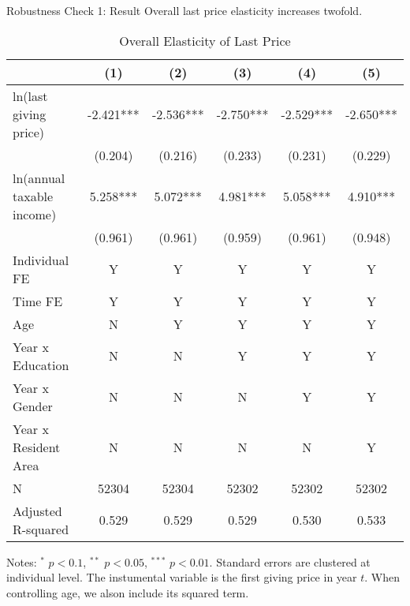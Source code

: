\documentclass[
  ignorenonframetext,
  aspectratio=169,
]{beamer}
\begin{document}
\begin{frame}{Robustness Check 1: Result}
\protect\hypertarget{robustness-check-1-result}{}
Overall last price elasticity increases twofold.

\begin{table}

\caption{\label{tab:LastOverall}Overall Elasticity of Last Price}
\centering
\fontsize{7}{9}\selectfont
\begin{threeparttable}
\begin{tabular}[t]{lccccc}
\toprule
 & (1) & (2) & (3) & (4) & (5)\\
\midrule
ln(last giving price) & -2.421*** & -2.536*** & -2.750*** & -2.529*** & -2.650***\\
 & (0.204) & (0.216) & (0.233) & (0.231) & (0.229)\\
ln(annual taxable income) & 5.258*** & 5.072*** & 4.981*** & 5.058*** & 4.910***\\
 & (0.961) & (0.961) & (0.959) & (0.961) & (0.948)\\
Individual FE & Y & Y & Y & Y & Y\\
Time FE & Y & Y & Y & Y & Y\\
Age & N & Y & Y & Y & Y\\
Year x Education & N & N & Y & Y & Y\\
Year x Gender & N & N & N & Y & Y\\
Year x Resident Area & N & N & N & N & Y\\
N & 52304 & 52304 & 52302 & 52302 & 52302\\
Adjusted R-squared & 0.529 & 0.529 & 0.529 & 0.530 & 0.533\\
\bottomrule
\end{tabular}
\begin{tablenotes}
\item Notes: $^{*}$ $p < 0.1$, $^{**}$ $p < 0.05$, $^{***}$ $p < 0.01$. Standard errors are clustered at individual level. The instumental variable is the first giving price in year $t$. When controlling age, we alson include its squared term.
\end{tablenotes}
\end{threeparttable}
\end{table}
\end{frame}
\end{document}
